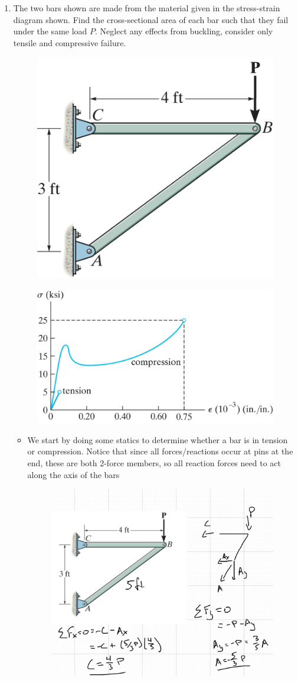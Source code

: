 \documentclass[12pt, oneside]{article}
\begin{document}
\begin{enumerate}
	\item %
		The two bars shown are made from the material given in the stress-strain diagram shown.
		Find the cross-sectional area of each bar such that they fail under the same load $P$. 
		Neglect any effects from buckling, consider only tensile and compressive failure.
		\begin{figure}[H]
			\centering
			\includegraphics[width=0.4\linewidth]{plastic1}
			\label{fig:plastic1}
		\end{figure}
		\begin{figure}[H]
			\centering
			\includegraphics[width=0.7\linewidth]{plastic2}
			\label{fig:plastic2}
		\end{figure}
		\begin{itemize}
			\item We start by doing some statics to determine whether a bar is in tension or compression. Notice that since all forces/reactions occur at pins at the end, these are both 2-force members, so all reaction forces need to act along the axis of the bars
			\begin{figure}[H]
				\centering
				\includegraphics[width=0.6\linewidth]{hw2-7}

\end{figure}
\end{itemize}
\end{enumerate}
\end{document}
